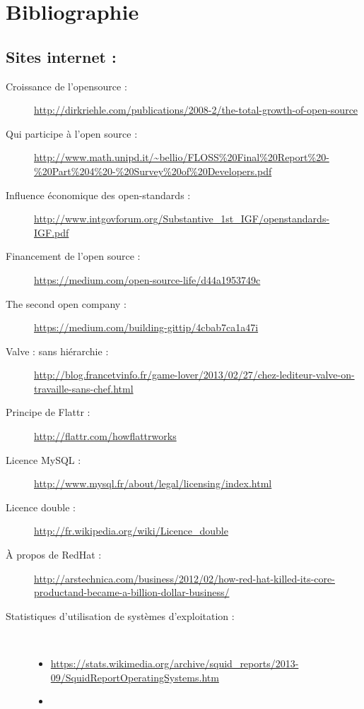 \chapter*{Bibliographie}

{
\sloppy
\section*{Sites internet :\\}

\begin{description}
    \item[Croissance de l'opensource :]
        \url{http://dirkriehle.com/publications/2008-2/the-total-growth-of-open-source}

    \item[Qui participe à l'open source :]
        \url{http://www.math.unipd.it/~bellio/FLOSS%20Final%20Report%20-%20Part%204%20-%20Survey%20of%20Developers.pdf}
    \item[Influence économique des open-standards :]
        \url{http://www.intgovforum.org/Substantive_1st_IGF/openstandards-IGF.pdf}
    \item[Financement de l'open source :]
        \url{https://medium.com/open-source-life/d44a1953749c}
    \item[The second open company :]
        \url{https://medium.com/building-gittip/4cbab7ca1a47i}
    \item[Valve : sans hiérarchie :]
        \url{http://blog.francetvinfo.fr/game-lover/2013/02/27/chez-lediteur-valve-on-travaille-sans-chef.html}
    \item[Principe de Flattr :] \url{http://flattr.com/howflattrworks}
    \item[Licence MySQL :]
        \url{http://www.mysql.fr/about/legal/licensing/index.html}
    \item[Licence double :] \url{http://fr.wikipedia.org/wiki/Licence_double}
    \item[À propos de RedHat :]
        \url{http://arstechnica.com/business/2012/02/how-red-hat-killed-its-core-productand-became-a-billion-dollar-business/}
    \item[Statistiques d'utilisation de systèmes d'exploitation :]\
        \begin{itemize}[label=\textbullet]
            \item \url{https://stats.wikimedia.org/archive/squid_reports/2013-09/SquidReportOperatingSystems.htm}
            \item

\end{itemize}
\end{description}}

